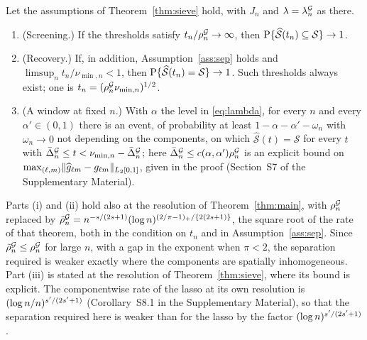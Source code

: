 \begin{corollary}
\label{cor:threshold}
Let the assumptions of Theorem~\ref{thm:sieve} hold, with $J_n$ and  $\lambda = \lambda^{\mathcal{G}}_{n}$ as
there.
\begin{enumerate}
\item[(i)] (Screening.) If the thresholds satisfy  $t_n/\rho^{\mathcal{G}}_{n} \to \infty$,
then $\mathrm{P}\{\widehat{\mathcal{S}}(t_n) \subseteq \mathcal{S}\} \to 1$.
\item[(ii)] (Recovery.) If, in addition, Assumption~\ref{ass:sep} holds and
$\limsup_n t_n/\nu_{\min,n} < 1$, then $\mathrm{P}\{\widehat{\mathcal{S}}(t_n) = \mathcal{S}\} \to 1$.
Such thresholds always exist; one is  $t_n = (\rho^{\mathcal{G}}_{n}\nu_{\min,n})^{1/2}$.
\item[(iii)] (A window at fixed $n$.) With $\alpha$ the level in
\eqref{eq:lambda}, for every $n$ and every $\alpha' \in (0,1)$ there is an
event, of probability at least
$1 - \alpha - \alpha' - \omega_n$ with $\omega_n \to 0$ not depending on the
components, on which $\widehat{\mathcal{S}}(t) = \mathcal{S}$ for every $t$
with  $\bar{\Delta}^{\mathcal{G}}_n \le t < \nu_{\min,n} - \bar{\Delta}^{\mathcal{G}}_n$; here
 $\bar{\Delta}^{\mathcal{G}}_n \le c(\alpha,\alpha')\rho^{\mathcal{G}}_{n}$ is an explicit bound on
$\max_{(\ell,m)}\lVert \widehat{g}_{\ell m} - g_{\ell m}
\rVert_{L_2[0,1]}$, given in the proof (Section~S7 of the Supplementary
Material).
\end{enumerate}
\end{corollary}

Parts (i) and (ii) hold also at the resolution of
Theorem~\ref{thm:main}, with  $\rho^{\mathcal{G}}_{n}$ replaced by
 $\tilde{\rho}^{\mathcal{G}}_{n} = n^{-s/(2s+1)}(\log n)^{(2/\pi-1)_{+}/\{2(2s+1)\}}$, the square root of the rate of that
theorem, both in the condition on $t_n$ and in Assumption~\ref{ass:sep}.
Since  $\tilde{\rho}^{\mathcal{G}}_{n} \le \rho^{\mathcal{G}}_{n}$ for large $n$, with a gap in the exponent when $\pi < 2$,
the separation required is weaker exactly where the components are spatially
inhomogeneous. Part (iii) is stated at the resolution of
Theorem~\ref{thm:sieve}, where its bound is explicit. The componentwise rate of
the lasso at its own resolution is $(\log n/n)^{s'/(2s'+1)}$
(Corollary~S8.1 in the Supplementary Material), so that the separation
required here is weaker than for the lasso by the factor
$(\log n)^{s'/(2s'+1)}$.

